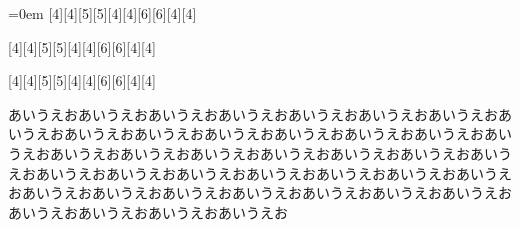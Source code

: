 \documentclass[luatex,fontsize=8pt,paper=b5,twoside,report]{jlreq}%
\begin{document}
{\parindent=0em [4][4][5][5][4][4][6][6][4][4]\par}

\begin{RanEnv}
[4][4][5][5][4][4][6][6][4][4]

[4][4][5][5][4][4][6][6][4][4]
\end{RanEnv}
あいうえおあいうえおあいうえおあいうえおあいうえおあいうえおあいうえおあいうえおあいうえおあいうえおあいうえおあいうえおあいうえおあいうえおあいうえおあいうえおあいうえおあいうえおあいうえおあいうえおあいうえおあいうえおあいうえおあいうえおあいうえおあいうえおあいうえおあいうえおあいうえおあいうえおあいうえおあいうえおあいうえおあいうえおあいうえおあいうえおあいうえおあいうえおあいうえおあいうえお
\end{document}

